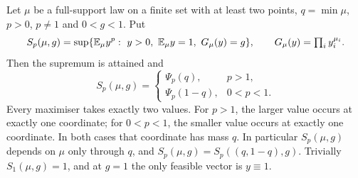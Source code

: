 \begin{lemma}\label{br:lem:key}
Let \(\mu\) be a full-support law on a finite set with at least two points,
\(q=\min\mu\), \(p>0\), \(p\ne1\) and \(0<g<1\). Put
\[
S_p(\mu,g)=\sup\{\E_\mu y^p:\ y>0,\ \E_\mu y=1,\ G_\mu(y)=g\},
\qquad G_\mu(y)=\textstyle\prod_i y_i^{\mu_i}.
\]
Then the supremum is attained and
\[
S_p(\mu,g)=\begin{cases}\Psi_p(q),&p>1,\\ \Psi_p(1-q),&0<p<1.\end{cases}
\]
Every maximiser takes exactly two values. For \(p>1\), the larger value
occurs at exactly one coordinate; for \(0<p<1\), the smaller value occurs at
exactly one coordinate. In both cases that coordinate has mass \(q\).
In particular \(S_p(\mu,g)\) depends on \(\mu\) only through \(q\), and
\(S_p(\mu,g)=S_p((q,1-q),g)\). Trivially \(S_1(\mu,g)=1\), and at \(g=1\) the
only feasible vector is \(y\equiv1\).
\end{lemma}
